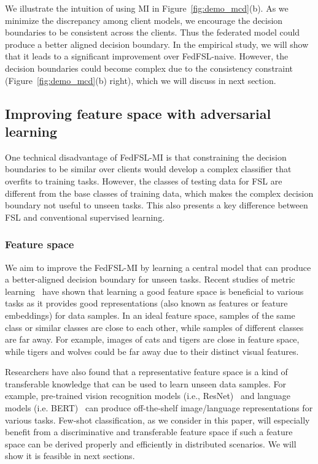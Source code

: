 We illustrate the intuition of using MI in Figure~\ref{fig:demo_mcd}(b).  As we minimize the discrepancy among client models, we encourage the decision boundaries to be consistent across the clients. Thus the federated model could produce a better aligned decision boundary. In the empirical study, we will show that it leads to a significant improvement over FedFSL-naive. 
However, the decision boundaries could become complex due to the consistency constraint (Figure~\ref{fig:demo_mcd}(b) right), which we will discuss in next section.





\subsection{Improving feature space with adversarial learning}
\label{sec:adv}

One technical disadvantage of FedFSL-MI is that constraining the decision boundaries to be similar over clients would develop a complex classifier that overfits to training tasks.
However, the classes of testing data for FSL are different from the base classes of training data, which makes the complex decision boundary not useful to unseen tasks. This also presents a key difference between FSL and conventional supervised learning.

\subsubsection{Feature space}
We aim to improve the FedFSL-MI by learning a central model that can produce a better-aligned decision boundary for unseen tasks.
Recent studies of metric learning~\cite{schroff2015facenet, Gidaris_2018_CVPR} have shown that learning a good feature space is beneficial to various tasks as it provides good 
representations (also known as features or feature embeddings) for data samples. In an ideal feature space, samples of the same class or similar classes are close to each other, while samples of different classes are far away. For example, images of cats and tigers are close in feature space, while tigers and wolves could be far away due to their distinct visual features. 


Researchers have also found that a representative feature space is a kind of transferable knowledge that can be used to learn unseen data samples. For example, pre-trained vision recognition models (i.e., ResNet)~\cite{sharif2014cnn, ren2015faster} and language models (i.e. BERT)~\cite{pennington2014glove, vaswani2017attention} can produce off-the-shelf image/language representations for various tasks. Few-shot classification, as we consider in this paper, will especially benefit from a discriminative and transferable feature space if such a feature space can be derived properly and efficiently in distributed scenarios. We will show it is feasible in next sections.


